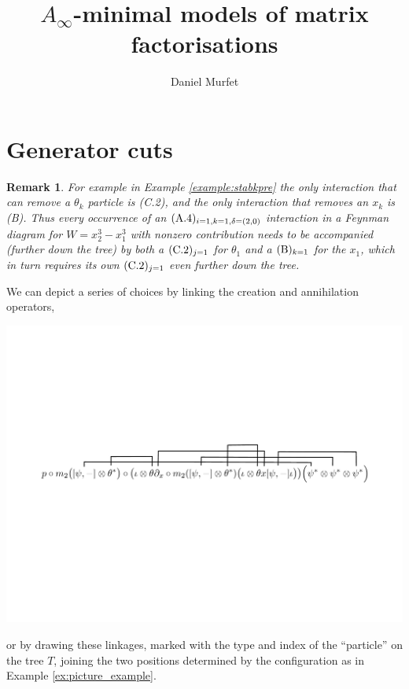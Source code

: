 \documentclass[english,letter paper,12pt,leqno]{article}
\theoremstyle{example}
\newtheorem{remark}[theorem]{Remark}
\numberwithin{equation}{section}
\def\res{\operatorname{Res}}
\begin{document}
\def\Res{\res\!}
\newcommand{\ud}{\mathrm{d}}
\newcommand{\Ress}[1]{\res_{#1}\!}
\newcommand{\cat}[1]{\mathcal{#1}}
\newcommand{\lto}{\longrightarrow}
\newcommand{\xlto}[1]{\stackrel{#1}\lto}
\newcommand{\mf}[1]{\mathfrak{#1}}
\newcommand{\md}[1]{\mathscr{#1}}
\def\sus{\l}
\def\l{\,|\,}
\def\sgn{\textup{sgn}}

\title{$A_\infty$-minimal models of matrix factorisations}
\author{Daniel Murfet}

\maketitle


\section{Generator cuts}

\begin{remark} For example in Example \ref{example:stabkpre} the only interaction that can remove a $\theta_k$ particle is (C.2), and the only interaction that removes an $x_k$ is (B). Thus every occurrence of an $(\textup{A}.4)_{i=1,k=1,\delta=(2,0)}$ interaction in a Feynman diagram for $W = x_2^3 - x_1^3$ with nonzero contribution needs to be accompanied (further down the tree) by both a $(\textup{C}.2)_{j=1}$ for $\theta_1$ and a $(\textup{B})_{k = 1}$ for the $x_1$, which in turn requires its own $(\textup{C}.2)_{j=1}$ even further down the tree.
\end{remark}

We can depict a series of choices by linking the creation and annihilation operators,
\begin{center}
\includegraphics[scale=0.45]{dia8}
\end{center}
or by drawing these linkages, marked with the type and index of the ``particle'' on the tree $T$, joining the two positions determined by the configuration as in Example \ref{ex:picture_example}.
\end{document}
